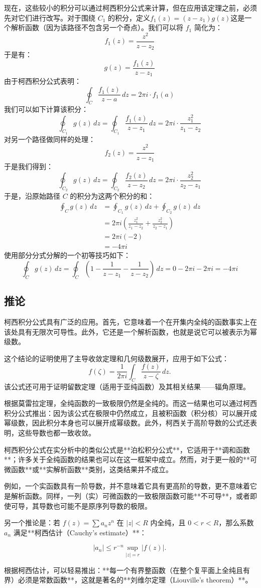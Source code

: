 现在，这些较小的积分可以通过柯西积分公式来计算，但在应用该定理之前，必须先对它们进行改写。对于围绕 $C_1$ 的积分，定义$ f_1(z) = (z - z_1)g(z)$这是一个解析函数（因为该路径不包含另一个奇点）。我们可以将 $f_1$ 简化为：
$$
f_1(z) = \frac{z^2}{z - z_2}~
$$
于是有：
$$
g(z) = \frac{f_1(z)}{z - z_1}~
$$
由于柯西积分公式表明：
$$
\oint_C \frac{f_1(z)}{z - a} \, dz = 2\pi i \cdot f_1(a)~
$$
我们可以如下计算该积分：
$$
\oint_{C_1} g(z) \, dz = \oint_{C_1} \frac{f_1(z)}{z - z_1} \, dz = 2\pi i \cdot \frac{z_1^2}{z_1 - z_2}~
$$
对另一个路径做同样的处理：
$$
f_2(z) = \frac{z^2}{z - z_1}~
$$
于是我们得到：
$$
\oint_{C_2} g(z) \, dz = \oint_{C_2} \frac{f_2(z)}{z - z_2} \, dz = 2\pi i \cdot \frac{z_2^2}{z_2 - z_1}~
$$
于是，沿原始路径 $C$ 的积分为这两个积分的和：
$$
\begin{aligned}
\oint_C g(z) \,dz 
&= \oint_{C_1} g(z) \,dz + \oint_{C_2} g(z) \,dz \\
&= 2\pi i \left( \frac{z_1^2}{z_1 - z_2} + \frac{z_2^2}{z_2 - z_1} \right) \\
&= 2\pi i (-2) \\
&= -4\pi i
\end{aligned}~
$$
使用部分分式分解的一个初等技巧如下：
$$
\oint_C g(z) \,dz = \oint_C \left(1 - \frac{1}{z - z_1} - \frac{1}{z - z_2} \right) \,dz = 0 - 2\pi i - 2\pi i = -4\pi i~
$$
\subsection{推论}
柯西积分公式具有广泛的应用。首先，它意味着一个在开集内全纯的函数事实上在该处具有无限次可导性。此外，它还是一个解析函数，也就是说它可以被表示为幂级数。

这个结论的证明使用了主导收敛定理和几何级数展开，应用于如下公式：
$$
f(\zeta) = \frac{1}{2\pi i} \int_C \frac{f(z)}{z - \zeta} \, dz.~
$$
该公式还可用于证明留数定理（适用于亚纯函数）及其相关结果——辐角原理。

根据莫雷拉定理，全纯函数的一致极限仍然是全纯的。而这一结果也可以通过柯西积分公式推出：因为该公式在极限中仍然成立，且被积函数（积分核）可以展开成幂级数，因此积分本身也可以展开成幂级数。此外，柯西关于高阶导数的公式还表明，这些导数也都一致收敛。

柯西积分公式在实分析中的类似公式是**泊松积分公式**，它适用于**调和函数**；许多关于全纯函数的结果也可以在这一框架中成立。然而，对于更一般的**可微函数**或**实解析函数**类别，这类结果并不成立。

例如，一个实函数具有一阶导数，并不意味着它具有更高阶的导数，更不意味着它是解析函数。同样，一列（实）可微函数的一致极限函数可能**不可导**，或者即使可导，其导数也可能不是原序列导数的极限。

另一个推论是：若 $f(z) = \sum a_n z^n$ 在 $|z| < R$ 内全纯，且 $0 < r < R$，那么系数 $a_n$ 满足**柯西估计（Cauchy’s estimate）**：

$$
|a_n| \leq r^{-n} \sup_{|z|=r} |f(z)|.~
$$

根据柯西估计，可以轻易推出：**每一个有界整函数（在整个复平面上全纯且有界）必须是常数函数**，这就是著名的**刘维尔定理（Liouville's theorem）**。
